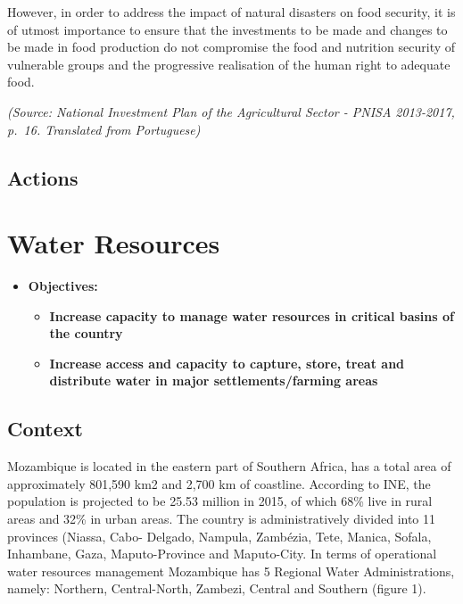 \documentclass[
]{book}
\providecommand{\tightlist}{%
  \setlength{\itemsep}{0pt}\setlength{\parskip}{0pt}}
\begin{document}
However, in order to address the impact of natural disasters on food security, it is of utmost importance to ensure that the investments to be made and changes to be made in food production do not compromise the food and nutrition security of vulnerable groups and the progressive realisation of the human right to adequate food.

\emph{(Source: National Investment Plan of the Agricultural Sector - PNISA 2013-2017, p.~16. Translated from Portuguese)}

\hypertarget{actions-2}{%
\subsection{Actions}\label{actions-2}}

\hypertarget{water-resources}{%
\section{Water Resources}\label{water-resources}}

\begin{itemize}
\tightlist
\item
  \textbf{Objectives:}

  \begin{itemize}
  \tightlist
  \item
    \textbf{Increase capacity to manage water resources in critical basins of the country}
  \item
    \textbf{Increase access and capacity to capture, store, treat and distribute water in major settlements/farming areas}
  \end{itemize}
\end{itemize}

\hypertarget{context-3}{%
\subsection{Context}\label{context-3}}

Mozambique is located in the eastern part of Southern Africa, has a total area of approximately 801,590 km2 and 2,700 km of coastline. According to INE, the population is projected to be 25.53 million in 2015, of which 68\% live in rural areas and 32\% in urban areas. The country is administratively divided into 11 provinces (Niassa, Cabo- Delgado, Nampula, Zambézia, Tete, Manica, Sofala, Inhambane, Gaza, Maputo-Province and Maputo-City. In terms of operational water resources management Mozambique has 5 Regional Water Administrations, namely: Northern, Central-North, Zambezi, Central and Southern (figure 1).
\end{document}
